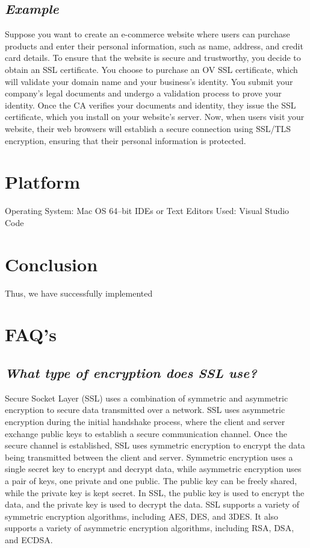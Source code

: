 \documentclass{article}
\begin{document}
\subsection{\textit{Example}}
Suppose you want to create an e-commerce website where users can purchase products and enter their personal information, such as name, address, and credit card details. To ensure that the website is secure and trustworthy, you decide to obtain an SSL certificate.
You choose to purchase an OV SSL certificate, which will validate your domain name and your business's identity. You submit your company's legal documents and undergo a validation process to prove your identity.
Once the CA verifies your documents and identity, they issue the SSL certificate, which you install on your website's server. Now, when users visit your website, their web browsers will establish a secure connection using SSL/TLS encryption, ensuring that their personal information is protected.

\section{\textbf{Platform}}
Operating System: Mac OS 64--bit
IDEs or Text Editors Used: Visual Studio Code

\section{\textbf{Conclusion}}
Thus, we have successfully implemented

\section{\textbf{FAQ's}}
\subsection{\textit{What type of encryption does SSL use?}}
Secure Socket Layer (SSL) uses a combination of symmetric and asymmetric encryption to secure data transmitted over a network. SSL uses asymmetric encryption during the initial handshake process, where the client and server exchange public keys to establish a secure communication channel. Once the secure channel is established, SSL uses symmetric encryption to encrypt the data being transmitted between the client and server.
Symmetric encryption uses a single secret key to encrypt and decrypt data, while asymmetric encryption uses a pair of keys, one private and one public. The public key can be freely shared, while the private key is kept secret. In SSL, the public key is used to encrypt the data, and the private key is used to decrypt the data.
SSL supports a variety of symmetric encryption algorithms, including AES, DES, and 3DES. It also supports a variety of asymmetric encryption algorithms, including RSA, DSA, and ECDSA.
\end{document}
